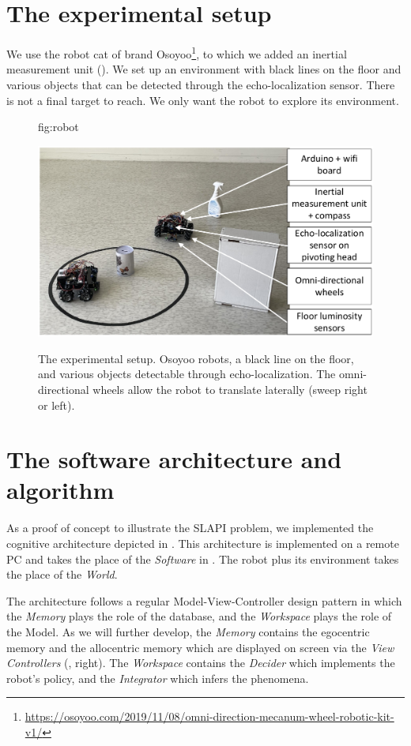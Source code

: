 \documentclass[pmlr]{jmlr}%
\begin{document}
\section{The experimental setup}
\label{sec:experiment}

We use the robot cat of brand Osoyoo\footnote{\url{https://osoyoo.com/2019/11/08/omni-direction-mecanum-wheel-robotic-kit-v1/}}, to which we added an inertial measurement unit (). 
We set up an environment with black lines on the floor and various objects that can be detected through the echo-localization sensor. 
There is not a final target to reach. We only want the robot to explore its environment. 

\begin{figure}[htbp]
	\floatconts
	{fig:robot}
	{\caption{The experimental setup. 
			Osoyoo robots, a black line on the floor, and various objects detectable through echo-localization.
		    The omni-directional wheels allow the robot to translate laterally (sweep right or left).}}
	{\includegraphics[width=0.8\linewidth]{images/Figure_1_Robotb}}
\end{figure}


\section{The software architecture and algorithm}
\label{sec:software}

As a proof of concept to illustrate the SLAPI problem, we implemented the cognitive architecture depicted in . 
This architecture is implemented on a remote PC and takes the place of the \textit{Software} in . The robot plus its environment takes the place of the \textit{World}.

The architecture follows a regular Model-View-Controller design pattern in which the \textit{Memory} plays the role of the database, and the \textit{Workspace} plays the role of the Model. 
As we will further develop, the \textit{Memory} contains the egocentric memory and the allocentric memory which are displayed on screen via the \textit{View Controllers} (, right).
The \textit{Workspace} contains the \textit{Decider} which implements the robot's policy, and the \textit{Integrator} which infers the phenomena. 
\end{document}
